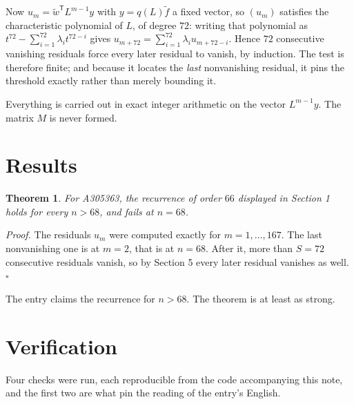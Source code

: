 \documentclass[11pt]{article}
\newtheorem{theorem}{Theorem}
\theoremstyle{definition}
\begin{document}
Now $u_m = \tilde w^{\mathsf T} L^{m-1} y$ with $y = q(L)\tilde f$ a fixed vector, so $(u_m)$ satisfies the characteristic polynomial of $L$, of degree $72$: writing that polynomial as $t^{72} - \sum_{i=1}^{72} \lambda_i t^{72-i}$ gives $u_{m+72} = \sum_{i=1}^{72} \lambda_i u_{m+72-i}$. Hence $72$ consecutive vanishing residuals force every later residual to vanish, by induction. The test is therefore finite; and because it locates the {\itshape last} nonvanishing residual, it pins the threshold exactly rather than merely bounding it.

Everything is carried out in exact integer arithmetic on the vector $L^{m-1}y$. The matrix $M$ is never formed.

\section{Results}

\begin{theorem} For A305363, the recurrence of order $66$ displayed in Section 1 holds for every $n > 68$, and fails at $n = 68$.\end{theorem}

{\itshape Proof.} The residuals $u_m$ were computed exactly for $m = 1,\dots,167$. The last nonvanishing one is at $m = 2$, that is at $n = 68$. After it, more than $S = 72$ consecutive residuals vanish, so by Section 5 every later residual vanishes as well. $\square$

The entry claims the recurrence for $n > 68$. The theorem is at least as strong.

\section{Verification}

Four checks were run, each reproducible from the code accompanying this note, and the first two are what pin the reading of the entry's English.
\end{document}
